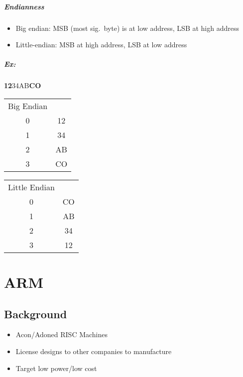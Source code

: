 \documentclass[12pt]{report}
\begin{document}
    \paragraph{Endianness}
    \begin{itemize}
      \item Big endian: MSB (most sig.\ byte) is at low address, LSB at high
      address
      \item Little-endian: MSB at high address, LSB at low address
    \end{itemize}
    \paragraph{Ex:} \textbf{12}34AB\textbf{CO}
    \begin{center}
      \begin{tabular}{c c}
        Big Endian &  \\
        0 & 12 \\
        1 & 34 \\
        2 & AB \\
        3 & CO \\
      \end{tabular}
      \begin{tabular}{c c}
        Little Endian & \\
        0 & CO \\
        1 & AB \\
        2 & 34 \\
        3 & 12 \\
      \end{tabular}
    \end{center}
\chapter{ARM}
  \section{Background}
    \begin{itemize}
      \item Acon/Adoned RISC Machines
      \item License designs to other companies to manufacture
      \item Target low power/low cost
    \end{itemize}
\end{document}

